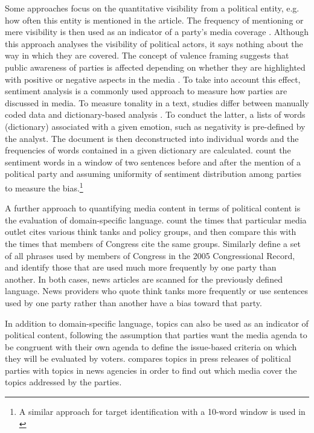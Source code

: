 \documentclass[12pt,a4paper,notitlepage]{article}
\begin{document}
Some approaches focus on the quantitative visibility from a political entity, e.g. how often this entity is mentioned in the article. The frequency of mentioning or mere visibility is then used as an indicator of a party's media coverage \citep{oegema_personalization_2009, eberl_one_2017, junque_de_fortuny_evaluating_2014}. Although this approach analyses the visibility of political actors, it says nothing about the way in which they are covered. The concept of valence framing suggests that public awareness of parties is affected depending on whether they are highlighted with positive or negative aspects in the media \citep{de_vreese_valenced_2006, hurtikova_importance_2017}. To take into account this effect, sentiment analysis is a commonly used approach to measure how parties are discussed in media. To measure tonality in a text, studies differ between manually coded data \citep{eberl_one_2017, dewenter_can_2018} and dictionary-based analysis \citep{junque_de_fortuny_media_2012}. To conduct the latter, a lists of words (dictionary) associated with a given emotion, such as negativity is pre-defined by the analyst. The document is then deconstructed into individual words and the frequencies of words contained in a given dictionary are calculated. \citet{junque_de_fortuny_media_2012} count the sentiment words in a window of two sentences before and after the mention of a political party and assuming uniformity of sentiment distribution among parties to measure the bias.\footnote{A similar approach for target identification with a 10-word window is used in \citet{balahur_sentiment_2013}} 

A further approach to quantifying media content in terms of political content is the evaluation of domain-specific language. \citet{groseclose_measure_2005} count the times that particular media outlet cites various think tanks and policy groups, and then compare this with the times that members of Congress cite the same groups. Similarly \citet{gentzkow_what_2010} define a set of all phrases used by members of Congress in the 2005 Congressional Record, and identify those that are used much more frequently by one party than another. In both cases, news articles are scanned for the previously defined language. News providers who quote think tanks more frequently or use sentences used by one party rather than another have a bias toward that party. 

In addition to domain-specific language, topics can also be used as an indicator of political content, following the assumption that parties want the media agenda to be congruent with their own agenda to define the issue-based criteria on which they will be evaluated by voters. \citet{eberl_one_2017} compares topics in press releases of political parties with topics in news agencies in order to find out which media cover the topics addressed by the parties. 
\end{document}
